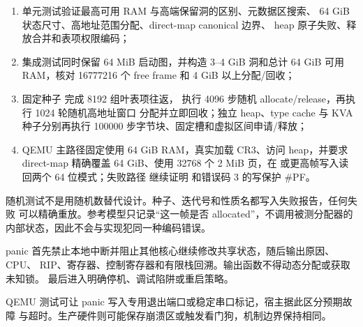 \begin{enumerate}[label=\arabic*.]
  \item 单元测试验证最高可用 RAM 与高端保留洞的区别、元数据区搜索、
        64 GiB 状态尺寸、高地址范围分配、direct-map canonical 边界、
        heap 原子失败、释放合并和表项权限编码；
  \item 集成测试同时保留 64 MiB 启动图，并构造 3--4 GiB 洞和总计 64 GiB
        可用 RAM，核对 16777216 个 free frame 和 4 GiB 以上分配/回收；
  \item 固定种子  完成 8192 组叶表项往返，
        执行 4096 步随机 allocate/release，再执行 1024 轮随机高地址窗口
        分配并立即回收；独立 heap、type cache 与 KVA 种子分别再执行
        100000 步字节块、固定槽和虚拟区间申请/释放；
  \item QEMU 主路径固定使用 64 GiB RAM，真实加载 CR3、访问 heap，并要求
        direct-map 精确覆盖 64 GiB、使用 32768 个 2 MiB 页，在
         或更高帧写入读回两个 64 位模式；失败路径
        继续证明  和错误码 3 的写保护 \#PF。
\end{enumerate}

随机测试不是用随机数替代设计。种子、迭代号和性质名都写入失败报告，任何失败
可以精确重放。参考模型只记录“这一帧是否 allocated”，不调用被测分配器的
内部状态，因此不会与实现犯同一种编码错误。

panic 首先禁止本地中断并阻止其他核心继续修改共享状态，随后输出原因、CPU、
RIP、寄存器、控制寄存器和有限栈回溯。输出函数不得动态分配或获取未知锁。
最后进入明确停机、调试陷阱或重启策略。

QEMU 测试可让 panic 写入专用退出端口或稳定串口标记，宿主据此区分预期故障
与超时。生产硬件则可能保存崩溃区或触发看门狗，机制边界保持相同。

